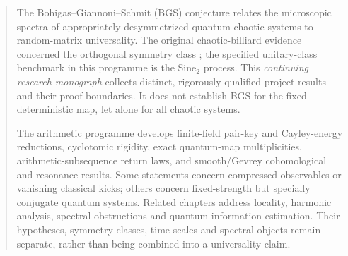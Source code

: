\maketitle

\begin{abstract}
The Bohigas--Giannoni--Schmit (BGS) conjecture relates the microscopic
spectra of appropriately desymmetrized quantum chaotic systems to
random-matrix universality. The original chaotic-billiard evidence concerned
the orthogonal symmetry class \cite{BGS1984}; the specified unitary-class
benchmark in this programme is the $\mathrm{Sine}_2$ process. This
\emph{continuing research monograph} collects distinct, rigorously
qualified project results and their proof boundaries. It does not establish
BGS for the fixed deterministic map, let alone for all chaotic systems.

The arithmetic programme develops finite-field pair-key and Cayley-energy
reductions, cyclotomic rigidity, exact quantum-map multiplicities,
arithmetic-subsequence return laws, and smooth/Gevrey cohomological and
resonance results. Some statements concern compressed observables or
vanishing classical kicks; others concern fixed-strength but specially
conjugate quantum systems. Related chapters address locality, harmonic
analysis, spectral obstructions and quantum-information estimation.
Their hypotheses, symmetry classes, time scales and spectral objects
remain separate, rather than being combined into a universality claim.


\end{abstract}
